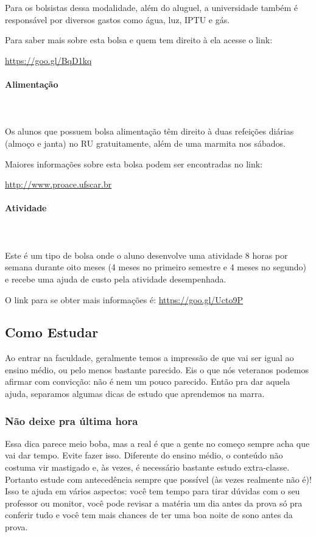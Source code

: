 Para os bolsistas dessa modalidade, além do aluguel, a universidade também é responsável por diversos gastos como água, luz, IPTU e gás.

Para saber mais sobre esta bolsa e quem tem direito à ela acesse o link:

\url{https://goo.gl/BqD1kq}

\paragraph{Alimentação}\mbox{} \\\\
\indent Os alunos que possuem bolsa alimentação têm direito à duas refeições diárias (almoço e janta) no RU gratuitamente, além de uma marmita nos sábados.

Maiores informações sobre esta bolsa podem ser encontradas no link:

\url{http://www.proace.ufscar.br}


\paragraph{Atividade}\mbox{} \\\\
\indent Este é um tipo de bolsa onde o aluno desenvolve uma atividade 8 horas por semana durante oito meses (4 meses no primeiro semestre e 4 meses no segundo) e recebe uma ajuda de custo pela atividade desempenhada.


O link para se obter mais informações é:
\url{https://goo.gl/Ucto9P}

\subsection{Como Estudar}
Ao entrar na faculdade, geralmente temos a impressão de que vai ser igual ao ensino médio, ou pelo menos bastante parecido. Eis o que nós veteranos podemos afirmar com convicção: não é nem um pouco parecido. Então pra dar aquela ajuda, separamos algumas dicas de estudo que aprendemos na marra.

\subsubsection{Não deixe pra última hora}
Essa dica parece meio boba, mas a real é que a gente no começo sempre acha que vai dar tempo. Evite fazer isso. Diferente do ensino médio, o conteúdo não costuma vir mastigado e, às vezes, é necessário bastante estudo extra-classe. Portanto estude com antecedência sempre que possível (às vezes realmente não é)! Isso te ajuda em vários aspectos: você tem tempo para tirar dúvidas com o seu professor ou monitor, você pode revisar a matéria um dia antes da prova só pra conferir tudo e você tem mais chances de ter uma boa noite de sono antes da prova.

